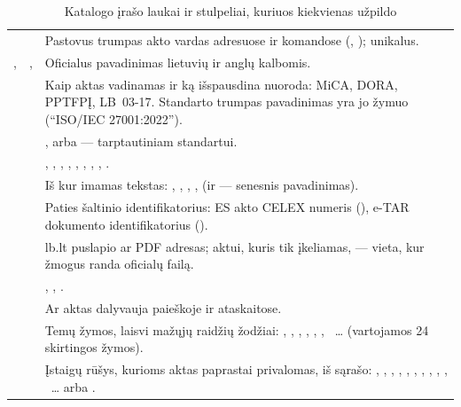 \begin{table}[H]
\caption{Katalogo įrašo laukai ir stulpeliai, kuriuos kiekvienas užpildo}\label{tab:corpus:fields}
\begin{tabularx}{\textwidth}{@{}L{27mm}L{31mm}Y@{}}
\toprule
{} &  &  \\
\midrule
{} &  & Pastovus trumpas akto vardas adresuose ir komandose (, ); unikalus. \\
,  & ,  & Oficialus pavadinimas lietuvių ir anglų kalbomis. \\
 &  & Kaip aktas vadinamas ir ką išspausdina nuoroda: MiCA, DORA, PPTFPĮ, LB~03-17. Standarto trumpas pavadinimas yra jo žymuo (\enquote{ISO/IEC 27001:2022}). \\
 &  & ,  arba  --- tarptautiniam standartui. \\
 &  & , , , , , , , , . \\
 &  & Iš kur imamas tekstas: , , , ,  (ir  --- senesnis  pavadinimas). \\
 &  & Paties šaltinio identifikatorius: ES akto CELEX numeris (), e-TAR dokumento identifikatorius (). \\
 &  & lb.lt puslapio ar PDF adresas; aktui, kuris tik įkeliamas, --- vieta, kur žmogus randa oficialų failą. \\
 &  & , , . \\
 &  & Ar aktas dalyvauja paieškoje ir ataskaitose. \\
 &  & Temų žymos, laisvi mažųjų raidžių žodžiai: , , , , , , ~… (vartojamos 24 skirtingos žymos). \\
 &  & Įstaigų rūšys, kurioms aktas paprastai privalomas, iš  sąrašo: , , , , , , , , , , ~… arba . \\

\end{tabularx}
\end{table}
